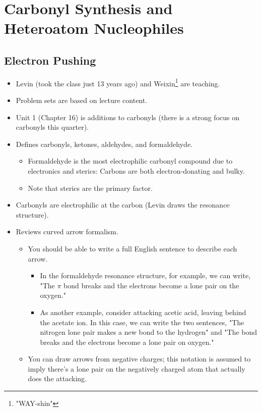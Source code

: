 \documentclass[../notes.tex]{subfiles}
\begin{document}
\chapter{Carbonyl Synthesis and Heteroatom Nucleophiles}
\section{Electron Pushing}
\begin{itemize}
    \item {}Levin (took the class just 13 years ago) and Weixin\footnote{"WAY-shin"} are teaching.
    \item Problem sets are based on lecture content.
    \item Unit 1 (Chapter 16) is additions to carbonyls (there is a strong focus on carbonyls this quarter).
    \item Defines carbonyls, ketones, aldehydes, and formaldehyde.
    \begin{itemize}
        \item Formaldehyde is the most electrophilic carbonyl compound due to electronics and sterics: Carbons are both electron-donating and bulky.
        \item Note that sterics are the primary factor.
    \end{itemize}
    \item Carbonyls are electrophilic at the carbon (Levin draws the resonance structure).
    \item Reviews curved arrow formalism.
    \begin{itemize}
        \item You should be able to write a full English sentence to describe each arrow.
        \begin{itemize}
            \item In the formaldehyde resonance structure, for example, we can write, "The  $\pi$ bond breaks and the electrons become a lone pair on the oxygen."
            \item As another example, consider  attacking acetic acid, leaving behind the acetate ion. In this case, we can write the two sentences, "The nitrogen lone pair makes a new bond to the hydrogen" and "The  bond breaks and the electrons become a lone pair on oxygen."
        \end{itemize}
        \item You can draw arrows from negative charges; this notation is assumed to imply there's a lone pair on the negatively charged atom that actually does the attacking.

\end{itemize}
\end{itemize}
\end{document}
